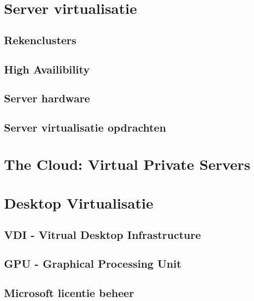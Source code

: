 \documentclass[a4paper,12pt,twoside,openright,titlepage]{book}
\begin{document}
\section{Server virtualisatie}

\subsection{Rekenclusters}

\subsection{High Availibility}

\subsection{Server hardware}

\subsection{Server virtualisatie opdrachten}


\section{The Cloud: Virtual Private Servers}


\section{Desktop Virtualisatie}

\subsection{VDI - Vitrual Desktop Infrastructure}

\subsection{GPU - Graphical Processing Unit}

\subsection{Microsoft licentie beheer}

\end{document}
